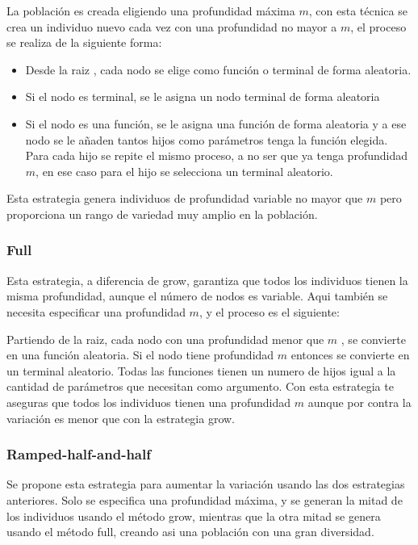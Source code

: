 \documentclass[12pt]{article} \usepackage[utf8x]{inputenc}
\begin{document}
La población es creada eligiendo una profundidad máxima \(m\), con esta técnica se crea un individuo nuevo cada vez con una profundidad no mayor a \(m\), el proceso se realiza de la siguiente forma:
\begin{itemize}
\item  Desde la raiz , cada nodo se elige como función o terminal de forma aleatoria.
\item  Si el nodo es terminal, se le asigna un nodo terminal de forma aleatoria
\item  Si el nodo es una función, se le asigna una función de forma aleatoria y a ese nodo se le añaden tantos hijos como parámetros tenga la función elegida. Para cada hijo se repite el mismo proceso, a no ser que ya tenga profundidad \(m\), en ese caso para el hijo se selecciona un terminal aleatorio.
\end{itemize}

Esta estrategia genera individuos de profundidad variable no mayor que \(m\) pero proporciona un rango de variedad muy amplio en la población.

\subsubsection{Full}

Esta estrategia, a diferencia de grow, garantiza que todos los individuos tienen la misma profundidad, aunque el número de nodos es variable. Aqui también se necesita especificar una profundidad \(m\), y el proceso es el siguiente:

 Partiendo de la raiz, cada nodo con una profundidad menor que \(m\) , se convierte en una función aleatoria. Si el nodo tiene profundidad \(m\) entonces se convierte en un terminal aleatorio. 
 Todas las funciones tienen un numero de hijos igual a la cantidad de parámetros que necesitan como argumento. Con esta estrategia te aseguras que todos los individuos tienen una profundidad \(m\) aunque por contra la variación es menor que con la estrategia grow.\\
 
 \subsubsection{Ramped-half-and-half}
 
 Se propone esta estrategia para aumentar la variación usando las dos estrategias anteriores. Solo se especifica una profundidad máxima, y se generan la mitad de los individuos usando el método grow, mientras que la otra mitad se genera usando el método full, creando asi una población con una gran diversidad.
 
\end{document}
